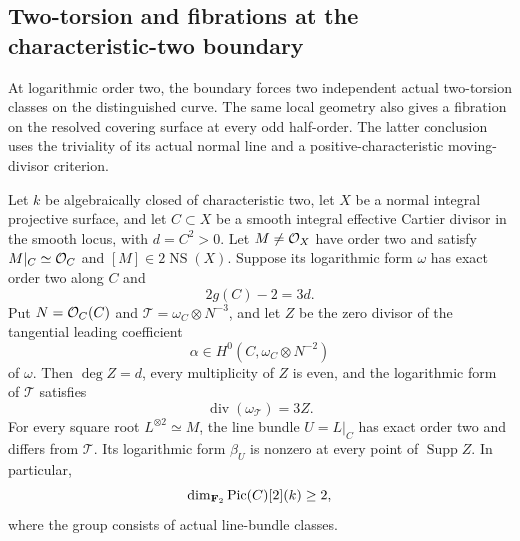 \subsection{Two-torsion and fibrations at the characteristic-two boundary}
\label{subsec:smallest-endpoint-geometry}

At logarithmic order two, the boundary forces two independent actual
two-torsion classes on the distinguished curve.  The same local geometry
also gives a fibration on the resolved covering surface at every odd
half-order.  The latter conclusion uses the triviality of its actual
normal line and a positive-characteristic moving-divisor criterion.

\begin{proposition}
\label{prop:smallest-endpoint-rank}
Let $k$ be algebraically closed of characteristic two, let $X$ be a
normal integral projective surface, and let $C\subset X$ be a smooth
integral effective Cartier divisor in the smooth locus, with $d=C^2>0$.
Let $M\ne\mathcal O_X$ have order two and satisfy $M|_C\simeq\mathcal O_C$ and
$[M]\in2\operatorname{NS}(X)$.  Suppose its logarithmic form $\omega$
has exact order two along $C$ and
\[
 2g(C)-2=3d.
\]
Put $N=\mathcal O_C(C)$ and $\mathcal T=\omega_C\otimes N^{-3}$, and let
$Z$ be the zero divisor of the tangential leading coefficient
\[
 \alpha\in H^0(C,\omega_C\otimes N^{-2})
\]
of $\omega$.  Then $\deg Z=d$, every multiplicity of $Z$ is even,
and the logarithmic form of $\mathcal T$ satisfies
\begin{equation}\label{eq:smallest-endpoint-log-divisor}
 \operatorname{div}(\omega_{\mathcal T})=3Z.
\end{equation}
For every square root $L^{\otimes2}\simeq M$, the line bundle
$U=L|_C$ has exact order two and differs from $\mathcal T$.
Its logarithmic form $\beta_U$ is nonzero at every point of
$\operatorname{Supp}Z$.  In particular,
\[
 \dim_{\mathbf F_2}\operatorname{Pic}(C)[2](k)\geq2,
\]
where the group consists of actual line-bundle classes.
\end{proposition}


